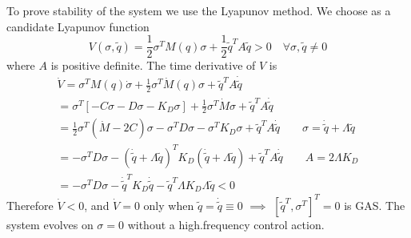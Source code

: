 \documentclass{book}
\begin{document}
To prove stability of the system we use the Lyapunov method. We choose as a candidate Lyapunov function 
\[
    V(\sigma,\tilde{q}) = \displaystyle\frac{1}{2}\sigma^TM(q)\sigma+\displaystyle\frac{1}{2}\tilde{q}^TA\tilde{q}>0 \quad \forall \sigma,\tilde{q} \neq 0 
\]
where $A$ is positive definite.
The time derivative of $V$ is 
\begin{gather*}
    \dot{V}=\sigma^TM(q)\dot{\sigma}+\displaystyle\frac{1}{2}\sigma^T\dot{M}(q)\sigma+\tilde{q}^TA\dot{\tilde{q}}\\
    =\sigma^T[-C\sigma-D\sigma-K_D\sigma]+\displaystyle\frac{1}{2}\sigma^T\dot{M}\sigma+\tilde{q}^TA\dot{\tilde{q}}\\
    =\displaystyle\frac{1}{2}\sigma^T(\dot{M}-2C)\sigma-\sigma^TD\sigma-\sigma^TK_D\sigma+\tilde{q}^TA\dot{\tilde{q}} \qquad \sigma=\dot{\tilde{q}}+\Lambda\tilde{q} \\
    =-\sigma^TD\sigma-(\dot{\tilde{q}}+\Lambda\tilde{q})^TK_D(\dot{\tilde{q}}+\Lambda\tilde{q})+\tilde{q}^TA\dot{\tilde{q}} \qquad A=2\Lambda K_D\\
    =-\sigma^TD\sigma-\dot{\tilde{q}}^TK_D\dot{\tilde{q}}-\tilde{q}^T\Lambda K_D \Lambda \tilde{q}<0
\end{gather*}
Therefore $\dot{V}<0$, and $\dot{V}=0$ only when $\tilde{q}=\dot{\tilde{q}}\equiv 0$ $\implies$ $[\tilde{q}^T,\sigma^T]^T=0$ is GAS. The system evolves on $\sigma=0$ without a high.frequency control action.
\end{document}
